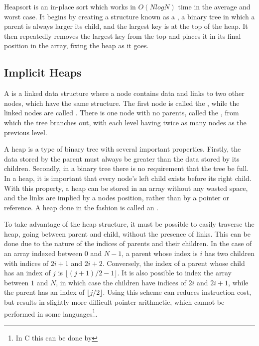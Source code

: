 \label{heap}

Heapsort is an in-place sort which works in $O(NlogN)$ time in the average and
worst case. It begins by creating a structure known as a , a binary tree
in which a parent is always larger its child, and the largest key is at the top
of the heap. It then repeatedly removes the largest key from the top and places
it in its final position in the array, fixing the heap as it goes.

\subsection{Implicit Heaps}

A  is a linked data structure where a node contains data and links
to two other nodes, which have the same structure. The first node is called the
, while the linked nodes are called . There is one node
with no parents, called the , from which the tree branches out, with
each level having twice as many nodes as the previous level.

A heap is a type of binary tree with several important properties. Firstly, the
data stored by the parent must always be greater than the data stored by its
children. Secondly, in a binary tree there is no requirement that the tree be
full. In a heap, it is important that every node's left child exists before its
right child. With this property, a heap can be stored in an array without any
wasted space, and the links are implied by a nodes position, rather than by a
pointer or reference. A heap done in the fashion is called an .

To take advantage of the heap structure, it must be possible to easily traverse
the heap, going between parent and child, without the presence of links. This
can be done due to the nature of the indices of parents and their children. In
the case of an array indexed between $0$ and $N-1$, a parent whose index is
$i$ has two children with indices of $2i+1$ and $2i+2$. Conversely, the index of
a parent whose child has an index of $j$ is $\lfloor{}(j+1)/2-1\rfloor{}$. It is
also possible to index the array between $1$ and $N$, in which case the children
have indices of $2i$ and $2i+1$, while the parent has an index of
$\lfloor{}j/2\rfloor{}$. Using this scheme can reduces instruction cost, but
results in slightly more difficult pointer arithmetic, which cannot be performed
in some languages\footnote{In C this can be done by }.

